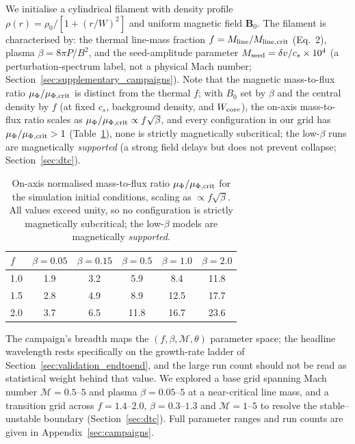 \documentclass[usenatbib,twoside,twocolumn]{mnras}
\begin{document}
We initialise a cylindrical filament with density profile $\rho(r) = \rho_0 / [1 + (r/W)^2]$ and uniform magnetic field $\mathbf{B}_0$. The filament is characterised by: the thermal line-mass fraction $f = M_{\rm line}/M_{\rm line,crit}$ (Eq.~2), plasma $\beta = 8\pi P/B^2$, and the seed-amplitude parameter $M_{\rm seed}=\delta v/c_s\times10^{4}$ (a perturbation-spectrum label, not a physical Mach number; Section~\ref{sec:supplementary_campaigns}). Note that the magnetic mass-to-flux ratio $\mu_\Phi/\mu_{\Phi,\rm crit}$ is distinct from the thermal $f$; with $B_0$ set by $\beta$ and the central density by $f$ (at fixed $c_s$, background density, and $W_{\rm core}$), the on-axis mass-to-flux ratio scales as $\mu_\Phi/\mu_{\Phi,\rm crit}\propto f\sqrt{\beta}$, and every configuration in our grid has $\mu_\Phi/\mu_{\Phi,\rm crit}>1$ (Table~\ref{tab:massflux}), none is strictly magnetically subcritical; the low-$\beta$ runs are magnetically \emph{supported} (a strong field delays but does not prevent collapse; Section~\ref{sec:dtc}).

\begin{table}
\caption{On-axis normalised mass-to-flux ratio $\mu_\Phi/\mu_{\Phi,\rm crit}$ for the simulation initial conditions, scaling as $\propto f\sqrt{\beta}$. All values exceed unity, so no configuration is strictly magnetically subcritical; the low-$\beta$ models are magnetically \emph{supported}.}
\label{tab:massflux}
\footnotesize
\setlength{\tabcolsep}{4pt}
\begin{tabular}{lccccc}
\toprule
$f$ & $\beta{=}0.05$ & $\beta{=}0.15$ & $\beta{=}0.5$ & $\beta{=}1.0$ & $\beta{=}2.0$ \\
\midrule
1.0 & 1.9 & 3.2 & 5.9 & 8.4 & 11.8 \\
1.5 & 2.8 & 4.9 & 8.9 & 12.5 & 17.7 \\
2.0 & 3.7 & 6.5 & 11.8 & 16.7 & 23.6 \\
\bottomrule
\end{tabular}
\end{table}

The campaign's breadth maps the $(f,\beta,\mathcal{M},\theta)$ parameter space; the headline wavelength rests specifically on the growth-rate ladder of Section~\ref{sec:validation_endtoend}, and the large run count should not be read as statistical weight behind that value. We explored a base grid spanning Mach number $\mathcal{M}=0.5$--$5$ and plasma $\beta=0.05$--$5$ at a near-critical line mass, and a transition grid across $f=1.4$--$2.0$, $\beta=0.3$--$1.3$ and $\mathcal{M}=1$--$5$ to resolve the stable--unstable boundary (Section~\ref{sec:dtc}). Full parameter ranges and run counts are given in Appendix~\ref{sec:campaigns}.
\end{document}
